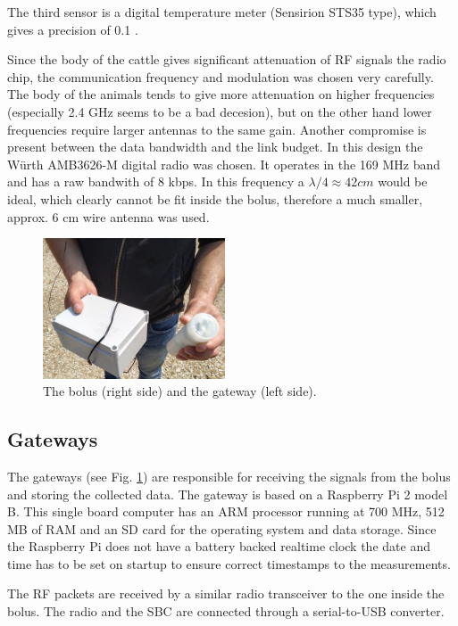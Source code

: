 \documentclass[conference]{IEEEtran}
\begin{document}
The third sensor is a digital temperature meter (Sensirion STS35 type), which gives
a precision of 0.1 \textcelsius.

Since the body of the cattle gives significant attenuation of RF signals
the radio chip, the communication frequency and modulation was chosen very
carefully. The body of the animals tends to give more attenuation on higher
frequencies (especially 2.4 GHz seems to be a bad decesion), but on the
other hand lower frequencies require larger antennas to the same gain.
Another compromise is present between the data bandwidth and the link budget.
In this design the Würth AMB3626-M digital radio was chosen. It operates in the 169 MHz
band and has a raw bandwith of 8 kbps. In this frequency a
$\lambda / 4 \approx 42 cm$ would be ideal, which clearly cannot be fit
inside the bolus, therefore a much smaller, approx. 6 cm wire antenna
was used.

\begin{figure}[htbp]
  \centerline{\includegraphics[width=0.48\textwidth]{fig/bolus_gw_photo.jpg}}
  \caption{The bolus (right side) and the gateway (left side).}
  \label{bolus-gw-photo}
\end{figure}

\subsection{Gateways}

The gateways (see Fig. \ref{bolus-gw-photo}) are responsible for receiving
the signals from the bolus and
storing the collected data. The gateway is based on a Raspberry Pi 2 model B.
This single board computer has an ARM processor running at 700 MHz, 512 MB of
RAM and an SD card for the operating system and data storage. Since the
Raspberry Pi does not have a battery backed realtime clock the date and
time has to be set on startup to ensure correct timestamps to the
measurements.

The RF packets are received by a similar radio transceiver to the one inside the
bolus. The radio and the SBC are connected through a serial-to-USB converter.
\end{document}
